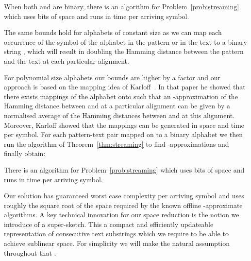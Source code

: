 \begin{theorem}\label{thm:streaming}
When both  and  are binary, there is an algorithm for Problem~\ref{prob:streaming} which uses  bits of space and runs in  time per arriving symbol.
\end{theorem}

The same bounds hold for alphabets of constant size  as we can map each occurrence of the  symbol of the alphabet in the pattern or in the text to a binary string , which will result in doubling the Hamming distance between the pattern and the text at each particular alignment. 

For polynomial size alphabets our bounds are higher by a factor  and our approach is based on the mapping idea of Karloff~\cite{Karloff:1993}. In that paper he showed that there exists  mappings  of the alphabet onto  such that an -approximation of the Hamming distance between  and  at a particular alignment can be given by a normalised average of the Hamming distances between  and  at this alignment. Moreover, Karloff showed that the mappings can be generated in  space and  time per symbol. For each pattern-text pair mapped on to a binary alphabet we then run the algorithm of Theorem~\ref{thm:streaming} to find -approximations and finally obtain: 

\begin{theorem}
There is an algorithm for Problem~\ref{prob:streaming} which uses  bits of space and runs in  time per arriving symbol.
\end{theorem}

Our solution has guaranteed worst case complexity per arriving symbol and uses roughly the square root of the space required by the known offline -approximate algorithms. A key technical innovation for our space reduction is the notion we introduce of a super-sketch. This a compact and efficiently updateable representation of consecutive text substrings which we require to be able to achieve sublinear space.  For simplicity we will make the natural assumption throughout that  .

